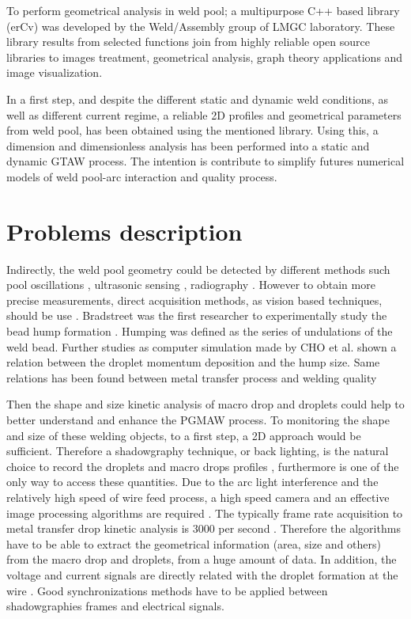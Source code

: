 To perform geometrical analysis in weld pool; a multipurpose C++ based library (erCv) was developed by the Weld/Assembly group of LMGC laboratory. These library results from selected functions join from highly reliable open source libraries to images treatment, geometrical analysis, graph theory applications and image visualization.

In a first step, and despite the different static and dynamic weld conditions, as well as different current regime, a reliable 2D profiles and geometrical parameters from weld pool, has been obtained using the mentioned library. Using this, a dimension and dimensionless analysis has been performed into a static and dynamic GTAW process. The intention is contribute to simplify futures numerical models of weld pool-arc interaction and quality process.



\section{Problems description}
\label{problem_description}

Indirectly, the weld pool geometry could be detected by different methods such pool oscillations \cite{RENWICK}, ultrasonic sensing \cite{CARLSON}, radiography \cite{ROKHLIN}. However to obtain more precise measurements, direct acquisition methods, as vision based techniques, should be use \cite{KOVACEVIC}.     Bradstreet was the first researcher to experimentally study the bead hump formation \cite{CHO}. Humping was defined as the series of undulations of the weld bead. Further studies as computer simulation made by CHO et al. \cite{CHO} shown a relation between the droplet momentum deposition and the hump size. Same relations has been found between metal transfer process and welding quality \cite{}

Then the shape and size kinetic analysis of macro drop and droplets could help to better understand and enhance the PGMAW process. To monitoring the shape and size of these welding objects, to a first step, a 2D approach would be sufficient. Therefore a shadowgraphy technique, or back lighting, is the natural choice to record the droplets and macro drops profiles \cite{BALSAMO}, furthermore is one of the only way to access these quantities. Due to the arc light interference and the relatively high speed of wire feed process, a high speed camera and an effective image processing algorithms are required \cite{WANG}. The typically frame rate acquisition to metal transfer drop kinetic analysis is $3000$ per second \cite{WANG}. Therefore the algorithms have to be able to extract the geometrical information (area, size and others) from the macro drop and droplets, from a huge amount of data. In addition, the voltage and current signals are directly related with the droplet formation at the wire \cite{BALSAMO}. Good synchronizations methods have to be applied between shadowgraphies frames and electrical signals.




